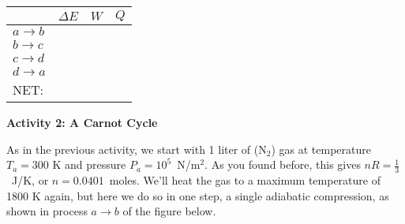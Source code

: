 
\vspace{0.1 in}
{\renewcommand{\arraystretch}{2.0}
\begin{tabular}{| C{1in} |C{1in} | C{1in} | C{1in} |}
\hline
& $\Delta E$ & $W$ & $Q$ \\ \hline
$a \rightarrow b$ & & & \\ \hline
$b \rightarrow c$ & & & \\ \hline
$c \rightarrow d$ & & & \\ \hline
$d \rightarrow a$ & & & \\
\hhline{|=|=|=|=|}
NET: & & & \\ \hline
\end{tabular}
}

\vspace{0.3in}

\pagebreak
\textbf{Activity 2: A Carnot Cycle}

As in the previous activity, we start with 1 liter of ($\textrm{N}_2$) gas at temperature $T_a = 300$ K and pressure $P_a=10^5$~N/m$^2$.   As you found before, this gives $nR=\frac{1}{3}$~J/K, or $n=0.0401$~moles.  We'll heat the gas to a maximum temperature of 1800 K again, but here we do so in one step, a single adiabatic compression, as shown in process $a \rightarrow b$ of the figure below.


